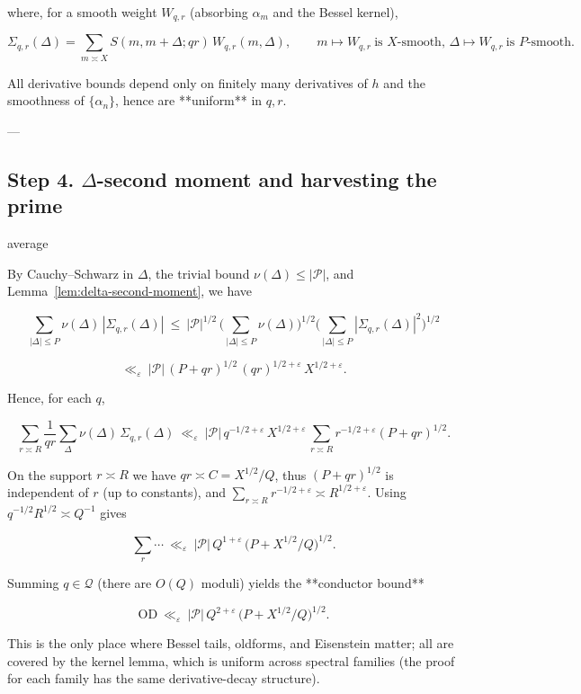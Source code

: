 \documentclass[11pt]{article}
\theoremstyle{definition}
\theoremstyle{remark}
\begin{document}
where, for a smooth weight $W_{q,r}$ (absorbing $\alpha_m$ and the Bessel kernel),

$$
\Sigma_{q,r}(\Delta)=\sum_{m\asymp X} S(m,m+\Delta;qr)\,W_{q,r}(m,\Delta),
\qquad m\mapsto W_{q,r}\ \text{is }X\text{-smooth,\ } \Delta\mapsto W_{q,r}\ \text{is }P\text{-smooth}.
$$

All derivative bounds depend only on finitely many derivatives of $h$ and the smoothness of $\{\alpha_n\}$, hence are **uniform** in $q,r$.

---

\subsection*{Step 4. $\Delta$-second moment and harvesting the prime}average

By Cauchy–Schwarz in $\Delta$, the trivial bound $\nu(\Delta)\le |\mathcal P|$, and Lemma~\ref{lem:delta-second-moment}, we have

$$
\sum_{|\Delta|\le P}\nu(\Delta)\,|\Sigma_{q,r}(\Delta)|
\ \le\ |\mathcal P|^{1/2}\,\Big(\sum_{|\Delta|\le P}\nu(\Delta)\Big)^{1/2}
\Big(\sum_{|\Delta|\le P}|\Sigma_{q,r}(\Delta)|^2\Big)^{1/2}
$$

$$
\ll_\varepsilon\ |\mathcal P|\,(P+qr)^{1/2}\,(qr)^{1/2+\varepsilon}\,X^{1/2+\varepsilon}.
$$

Hence, for each $q$,

$$
\sum_{r\asymp R}\frac{1}{qr}\sum_{\Delta}\nu(\Delta)\,\Sigma_{q,r}(\Delta)
\ \ll_\varepsilon\ |\mathcal P|\,q^{-1/2+\varepsilon}\,X^{1/2+\varepsilon}\,
\sum_{r\asymp R} r^{-1/2+\varepsilon}(P+qr)^{1/2}.
$$

On the support $r\asymp R$ we have $qr\asymp C=X^{1/2}/Q$, thus $(P+qr)^{1/2}$ is independent of $r$ (up to constants), and $\sum_{r\asymp R} r^{-1/2+\varepsilon}\asymp R^{1/2+\varepsilon}$. Using $q^{-1/2}R^{1/2}\asymp Q^{-1}$ gives

$$
\sum_{r}\cdots\ \ll_\varepsilon\ |\mathcal P|\,Q^{1+\varepsilon}\,\big(P+X^{1/2}/Q\big)^{1/2}.
$$

Summing $q\in\mathcal Q$ (there are $O(Q)$ moduli) yields the **conductor bound**

\begin{equation}
\boxed{\ \ \mathrm{OD}\ \ll_\varepsilon\ |\mathcal P|\,Q^{2+\varepsilon}\,\big(P+X^{1/2}/Q\big)^{1/2}. \ \ }
\tag{4.S.X}
\end{equation}

This is the only place where Bessel tails, oldforms, and Eisenstein matter; all are covered by the kernel lemma, which is uniform across spectral families (the proof for each family has the same derivative-decay structure).
\end{document}
